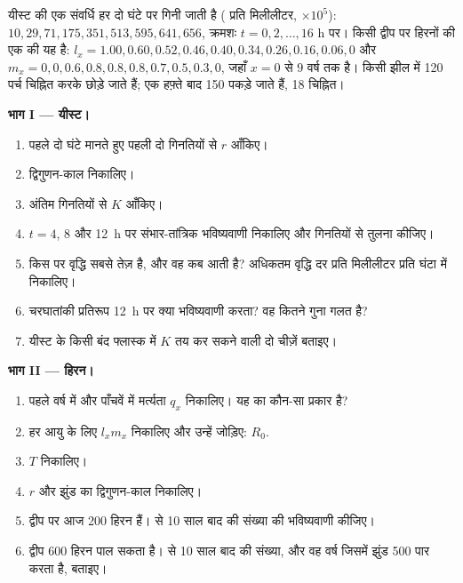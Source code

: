 \begin{problem}
\label{pb:b1:populations:1}
यीस्ट की एक संवर्धि हर दो घंटे पर गिनी जाती है ( प्रति मिलीलीटर,
$\times 10^5$): $10, 29, 71, 175, 351, 513, 595, 641, 656$, क्रमशः $t = 0,
2, \ldots, 16$ h पर। किसी द्वीप पर हिरनों की एक  की  यह
है: $l_x = 1.00, 0.60, 0.52, 0.46, 0.40, 0.34, 0.26, 0.16, 0.06, 0$ और
$m_x = 0, 0, 0.6, 0.8, 0.8, 0.8, 0.7, 0.5, 0.3, 0$, जहाँ $x = 0$ से $9$
वर्ष तक है। किसी झील में 120
पर्च चिह्नित करके छोड़े जाते हैं; एक हफ़्ते बाद 150 पकड़े जाते हैं, 18
चिह्नित।

\medskip
\noindent\textbf{भाग I --- यीस्ट।}
\begin{enumerate}
  \item पहले दो घंटे  मानते हुए पहली दो गिनतियों से
        $r$ आँकिए।
  \item द्विगुणन-काल निकालिए।
  \item अंतिम गिनतियों से $K$ आँकिए।
  \item $t = 4$, $8$ और \qty{12}{h} पर संभार-तांत्रिक भविष्यवाणी
        निकालिए और गिनतियों से तुलना कीजिए।
  \item किस  पर वृद्धि सबसे तेज़ है, और वह कब आती है? अधिकतम
        वृद्धि दर  प्रति मिलीलीटर प्रति घंटा में निकालिए।
  \item चरघातांकी प्रतिरूप \qty{12}{h} पर क्या भविष्यवाणी करता? वह
        कितने गुना गलत है?
  \item यीस्ट के किसी बंद फ्लास्क में $K$ तय कर सकने वाली दो चीज़ें
        बताइए।
\end{enumerate}

\medskip
\noindent\textbf{भाग II --- हिरन।}
\begin{enumerate}[resume]
  \item पहले वर्ष में और पाँचवें में मर्त्यता $q_x$ निकालिए। यह
         का कौन-सा प्रकार है?
  \item हर आयु के लिए $l_x m_x$ निकालिए और उन्हें जोड़िए: $R_0$.
  \item $T$ निकालिए।
  \item $r$ और झुंड का द्विगुणन-काल निकालिए।
  \item द्वीप पर आज 200 हिरन हैं।  से 10 साल बाद की
        संख्या की भविष्यवाणी कीजिए।
  \item द्वीप 600 हिरन पाल सकता है।  से 10 साल बाद
        की संख्या, और वह वर्ष जिसमें झुंड 500 पार करता है, बताइए।
\end{enumerate}


\end{problem}

